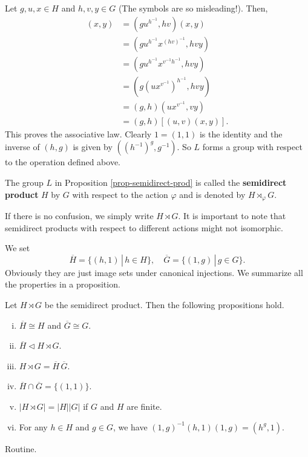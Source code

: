 \begin{sketch}
	Let $g, u, x \in H$ and $h, v, y \in G$ (The symbols are so misleading!). Then,
	\begin{align*}
		[(g, h)(u, v)](x, y) &= (gu^{h^{-1}},hv)(x, y) \\
		&= (gu^{h^{-1}}x^{(hv)^{-1}},hvy)
		\\
		&= (gu^{h^{-1}}x^{v^{-1}h^{-1}},hvy)
		\\
		&= (g(ux^{v^{-1}})^{h^{-1}},hvy)
		\\
		&= (g,h)(ux^{v^{-1}},vy)
		\\
		&=  (g, h)[(u, v)(x, y)].
	\end{align*}
	This proves the associative law. Clearly $1 = (1, 1)$ is the identity and the inverse of $(h, g)$ is given by $((h^{-1})^{g}, g^{-1})$. So $L$ forms a group with respect to the operation defined above.
\end{sketch}


\begin{definition}
	The group $L$ in Proposition \ref{prop-semidirect-prod} is called the \textbf{semidirect product} $H$ by $G$ with respect to the action $\varphi$ and is denoted by $H\rtimes_{\varphi} G$.
\end{definition}
 \begin{remark}
 	If there is no confusion, we simply write $H\rtimes G$. It is important to note that semidirect products with respect to different actions might not isomorphic. 
 \end{remark}
 
 We set
$$\overline{H} = \{(h,1) \,|\, h \in H\},\quad\overline{G} = \{(1,g)\,|\, g \in G\}.$$
Obviously they are just image sets under canonical injections.  We summarize all the properties in a proposition.
\begin{proposition} \label{prop-semidirect-prod-properties}
	Let $H \rtimes G$ be the semidirect product. Then the following propositions hold.
	\begin{enumerate}[(i)]
		\item $\overline{H} \cong H$ and $\overline{G}\cong G$.
		\item $\overline{H} \lhd  H \rtimes G$.
		\item $H \rtimes G= \overline{H}\,\overline{G}$.
		\item $\overline{H} \cap \overline{G} = \{(1,1)\}$.
		\item $|H \rtimes G| = |H|  |G|$ if $G$ and $H$ are finite.
		\item For any $h \in H$ and $g \in G$, we have $(1,g)^{-1}(h,1)(1,g) = (h^g,1)$.
	\end{enumerate}
\end{proposition} 
\begin{sketch}
	Routine.
\end{sketch}

